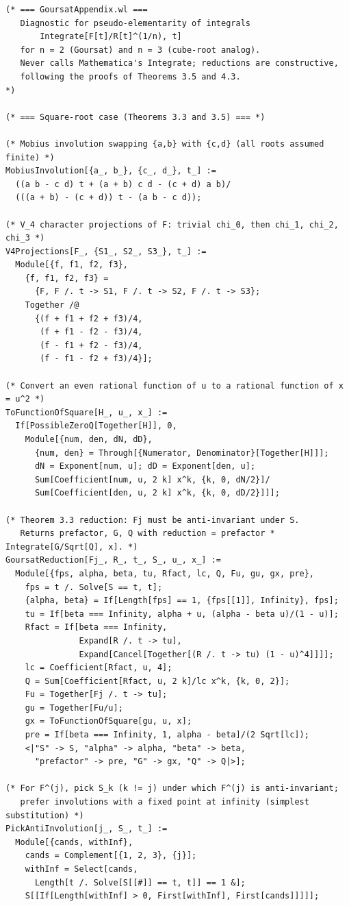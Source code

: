 \documentclass[11pt,a4paper]{article}
\theoremstyle{plain}
\theoremstyle{definition}
\theoremstyle{remark}
\begin{document}
\begin{lstlisting}
(* === GoursatAppendix.wl ===
   Diagnostic for pseudo-elementarity of integrals
       Integrate[F[t]/R[t]^(1/n), t]
   for n = 2 (Goursat) and n = 3 (cube-root analog).
   Never calls Mathematica's Integrate; reductions are constructive,
   following the proofs of Theorems 3.5 and 4.3.
*)

(* === Square-root case (Theorems 3.3 and 3.5) === *)

(* Mobius involution swapping {a,b} with {c,d} (all roots assumed finite) *)
MobiusInvolution[{a_, b_}, {c_, d_}, t_] :=
  ((a b - c d) t + (a + b) c d - (c + d) a b)/
  (((a + b) - (c + d)) t - (a b - c d));

(* V_4 character projections of F: trivial chi_0, then chi_1, chi_2, chi_3 *)
V4Projections[F_, {S1_, S2_, S3_}, t_] :=
  Module[{f, f1, f2, f3},
    {f, f1, f2, f3} =
      {F, F /. t -> S1, F /. t -> S2, F /. t -> S3};
    Together /@
      {(f + f1 + f2 + f3)/4,
       (f + f1 - f2 - f3)/4,
       (f - f1 + f2 - f3)/4,
       (f - f1 - f2 + f3)/4}];

(* Convert an even rational function of u to a rational function of x = u^2 *)
ToFunctionOfSquare[H_, u_, x_] :=
  If[PossibleZeroQ[Together[H]], 0,
    Module[{num, den, dN, dD},
      {num, den} = Through[{Numerator, Denominator}[Together[H]]];
      dN = Exponent[num, u]; dD = Exponent[den, u];
      Sum[Coefficient[num, u, 2 k] x^k, {k, 0, dN/2}]/
      Sum[Coefficient[den, u, 2 k] x^k, {k, 0, dD/2}]]];

(* Theorem 3.3 reduction: Fj must be anti-invariant under S.
   Returns prefactor, G, Q with reduction = prefactor * Integrate[G/Sqrt[Q], x]. *)
GoursatReduction[Fj_, R_, t_, S_, u_, x_] :=
  Module[{fps, alpha, beta, tu, Rfact, lc, Q, Fu, gu, gx, pre},
    fps = t /. Solve[S == t, t];
    {alpha, beta} = If[Length[fps] == 1, {fps[[1]], Infinity}, fps];
    tu = If[beta === Infinity, alpha + u, (alpha - beta u)/(1 - u)];
    Rfact = If[beta === Infinity,
               Expand[R /. t -> tu],
               Expand[Cancel[Together[(R /. t -> tu) (1 - u)^4]]]];
    lc = Coefficient[Rfact, u, 4];
    Q = Sum[Coefficient[Rfact, u, 2 k]/lc x^k, {k, 0, 2}];
    Fu = Together[Fj /. t -> tu];
    gu = Together[Fu/u];
    gx = ToFunctionOfSquare[gu, u, x];
    pre = If[beta === Infinity, 1, alpha - beta]/(2 Sqrt[lc]);
    <|"S" -> S, "alpha" -> alpha, "beta" -> beta,
      "prefactor" -> pre, "G" -> gx, "Q" -> Q|>];

(* For F^(j), pick S_k (k != j) under which F^(j) is anti-invariant;
   prefer involutions with a fixed point at infinity (simplest substitution) *)
PickAntiInvolution[j_, S_, t_] :=
  Module[{cands, withInf},
    cands = Complement[{1, 2, 3}, {j}];
    withInf = Select[cands,
      Length[t /. Solve[S[[#]] == t, t]] == 1 &];
    S[[If[Length[withInf] > 0, First[withInf], First[cands]]]]];


\end{lstlisting}
\end{document}
